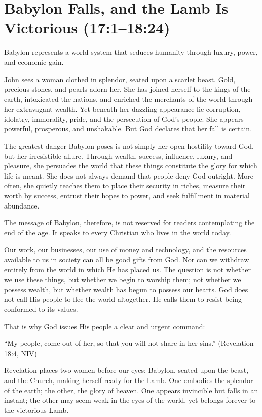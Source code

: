 \chapter{Babylon Falls, and the Lamb Is Victorious (17:1--18:24)}

Babylon represents a world system that seduces humanity through luxury, power, and economic gain.

John sees a woman clothed in splendor, seated upon a scarlet beast. Gold, precious stones, and pearls adorn her. She has joined herself to the kings of the earth, intoxicated the nations, and enriched the merchants of the world through her extravagant wealth. Yet beneath her dazzling appearance lie corruption, idolatry, immorality, pride, and the persecution of God's people. She appears powerful, prosperous, and unshakable. But God declares that her fall is certain.

The greatest danger Babylon poses is not simply her open hostility toward God, but her irresistible allure. Through wealth, success, influence, luxury, and pleasure, she persuades the world that these things constitute the glory for which life is meant. She does not always demand that people deny God outright. More often, she quietly teaches them to place their security in riches, measure their worth by success, entrust their hopes to power, and seek fulfillment in material abundance.

The message of Babylon, therefore, is not reserved for readers contemplating the end of the age. It speaks to every Christian who lives in the world today.

Our work, our businesses, our use of money and technology, and the resources available to us in society can all be good gifts from God. Nor can we withdraw entirely from the world in which He has placed us. The question is not whether we use these things, but whether we begin to worship them; not whether we possess wealth, but whether wealth has begun to possess our hearts. God does not call His people to flee the world altogether. He calls them to resist being conformed to its values.

That is why God issues His people a clear and urgent command:

“My people, come out of her, so that you will not share in her sins.” (Revelation 18:4, NIV)

Revelation places two women before our eyes: Babylon, seated upon the beast, and the Church, making herself ready for the Lamb. One embodies the splendor of the earth; the other, the glory of heaven. One appears invincible but falls in an instant; the other may seem weak in the eyes of the world, yet belongs forever to the victorious Lamb.

